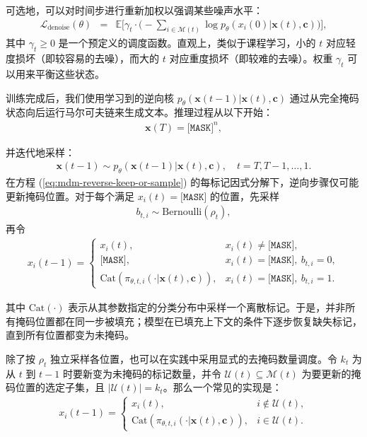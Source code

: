 \documentclass[UTF8,a4paper,zihao=-4,oneside,openany]{ctexbook}
\begin{document}
\noindent 可选地，可以对时间步进行重新加权以强调某些噪声水平：
\begin{eqnarray}
\mathcal{L}_{\text{denoise}}(\theta)
& = &
\mathbb{E}\Bigg[
\gamma_t \cdot
\Big(-\sum_{i\in \mathcal{M}(t)} \log p_\theta(x_i(0)| \mathbf{x}(t),\mathbf{c})\Big)
\Bigg],
\label{eq:mdm-denoise-ce-weighted}
\end{eqnarray}
其中 $\gamma_t\ge 0$ 是一个预定义的调度函数。直观上，类似于课程学习，小的 $t$ 对应轻度损坏（即较容易的去噪），而大的 $t$ 对应重度损坏（即较难的去噪）。权重 $\gamma_t$ 可以用来平衡这些状态。

训练完成后，我们使用学习到的逆向核 $p_\theta(\mathbf{x}(t-1)| \mathbf{x}(t),\mathbf{c})$ 通过从完全掩码状态向后运行马尔可夫链来生成文本。推理过程从以下开始：
\begin{eqnarray}
\mathbf{x}(T) = \texttt{[MASK]}^n,
\end{eqnarray}

\noindent 并迭代地采样：
\begin{eqnarray}
\mathbf{x}(t-1) \sim p_\theta(\mathbf{x}(t-1)| \mathbf{x}(t),\mathbf{c}), \quad t=T,T-1,\dots,1.
\label{eq:mdm-sampling-chain}
\end{eqnarray}
在方程 (\ref{eq:mdm-reverse-keep-or-sample}) 的每标记因式分解下，逆向步骤仅可能更新掩码位置。对于每个满足 $x_i(t)=\texttt{[MASK]}$ 的位置，先采样
\begin{eqnarray}
b_{t,i}\sim\mathrm{Bernoulli}(\rho_t),
\end{eqnarray}
再令
\begin{eqnarray}
x_i(t-1) =
\begin{cases}
x_i(t), & x_i(t)\neq \texttt{[MASK]},\\
\texttt{[MASK]}, & x_i(t)=\texttt{[MASK]},\ b_{t,i}=0,\\
\mathrm{Cat}\!\left(\pi_{\theta,t,i}( \cdot | \mathbf{x}(t),\mathbf{c})\right),
& x_i(t)=\texttt{[MASK]},\ b_{t,i}=1.
\end{cases}
\end{eqnarray}

\noindent 其中 $\mathrm{Cat}(\cdot)$ 表示从其参数指定的分类分布中采样一个离散标记。于是，并非所有掩码位置都在同一步被填充；模型在已填充上下文的条件下逐步恢复缺失标记，直到所有位置都变为未掩码。

除了按 $\rho_t$ 独立采样各位置，也可以在实践中采用显式的去掩码数量调度。令 $k_t$ 为从 $t$ 到 $t-1$ 时要新变为未掩码的标记数量，并令 $\mathcal{U}(t)\subseteq \mathcal{M}(t)$ 为要更新的掩码位置的选定子集，且 $|\mathcal{U}(t)| = k_t$。那么一个常见的实现是：
\begin{eqnarray}
x_i(t-1) =
\begin{cases}
x_i(t), & i\notin \mathcal{U}(t),\\
\mathrm{Cat}\!\left(\pi_{\theta,t,i}(\cdot | \mathbf{x}(t),\mathbf{c})\right), & i\in \mathcal{U}(t).
\end{cases}
\label{eq:mdm-partial-update}
\end{eqnarray}
\end{document}
